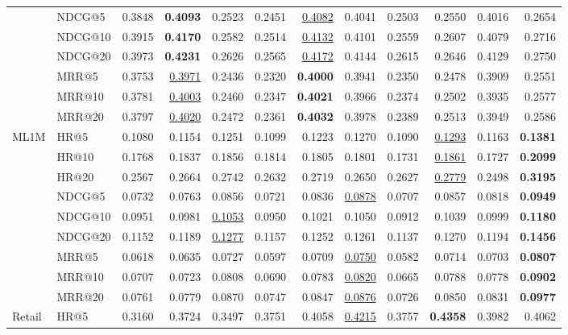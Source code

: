 \begin{tabular}{llrrrrrrrrrr}
 & NDCG@5 & 0.3848 & \textbf{0.4093} & 0.2523 & 0.2451 & \underline{0.4082} & 0.4041 & 0.2503 & 0.2550 & 0.4016 & 0.2654 \\
 & NDCG@10 & 0.3915 & \textbf{0.4170} & 0.2582 & 0.2514 & \underline{0.4132} & 0.4101 & 0.2559 & 0.2607 & 0.4079 & 0.2716 \\
 & NDCG@20 & 0.3973 & \textbf{0.4231} & 0.2626 & 0.2565 & \underline{0.4172} & 0.4144 & 0.2615 & 0.2646 & 0.4129 & 0.2750 \\
 & MRR@5 & 0.3753 & \underline{0.3971} & 0.2436 & 0.2320 & \textbf{0.4000} & 0.3941 & 0.2350 & 0.2478 & 0.3909 & 0.2551 \\
 & MRR@10 & 0.3781 & \underline{0.4003} & 0.2460 & 0.2347 & \textbf{0.4021} & 0.3966 & 0.2374 & 0.2502 & 0.3935 & 0.2577 \\
 & MRR@20 & 0.3797 & \underline{0.4020} & 0.2472 & 0.2361 & \textbf{0.4032} & 0.3978 & 0.2389 & 0.2513 & 0.3949 & 0.2586 \\
\hline
ML1M & HR@5 & 0.1080 & 0.1154 & 0.1251 & 0.1099 & 0.1223 & 0.1270 & 0.1090 & \underline{0.1293} & 0.1163 & \textbf{0.1381} \\
 & HR@10 & 0.1768 & 0.1837 & 0.1856 & 0.1814 & 0.1805 & 0.1801 & 0.1731 & \underline{0.1861} & 0.1727 & \textbf{0.2099} \\
 & HR@20 & 0.2567 & 0.2664 & 0.2742 & 0.2632 & 0.2719 & 0.2650 & 0.2627 & \underline{0.2779} & 0.2498 & \textbf{0.3195} \\
 & NDCG@5 & 0.0732 & 0.0763 & 0.0856 & 0.0721 & 0.0836 & \underline{0.0878} & 0.0707 & 0.0857 & 0.0818 & \textbf{0.0949} \\
 & NDCG@10 & 0.0951 & 0.0981 & \underline{0.1053} & 0.0950 & 0.1021 & 0.1050 & 0.0912 & 0.1039 & 0.0999 & \textbf{0.1180} \\
 & NDCG@20 & 0.1152 & 0.1189 & \underline{0.1277} & 0.1157 & 0.1252 & 0.1261 & 0.1137 & 0.1270 & 0.1194 & \textbf{0.1456} \\
 & MRR@5 & 0.0618 & 0.0635 & 0.0727 & 0.0597 & 0.0709 & \underline{0.0750} & 0.0582 & 0.0714 & 0.0703 & \textbf{0.0807} \\
 & MRR@10 & 0.0707 & 0.0723 & 0.0808 & 0.0690 & 0.0783 & \underline{0.0820} & 0.0665 & 0.0788 & 0.0778 & \textbf{0.0902} \\
 & MRR@20 & 0.0761 & 0.0779 & 0.0870 & 0.0747 & 0.0847 & \underline{0.0876} & 0.0726 & 0.0850 & 0.0831 & \textbf{0.0977} \\
\hline
Retail & HR@5 & 0.3160 & 0.3724 & 0.3497 & 0.3751 & 0.4058 & \underline{0.4215} & 0.3757 & \textbf{0.4358} & 0.3982 & 0.4062 \\

\end{tabular}

